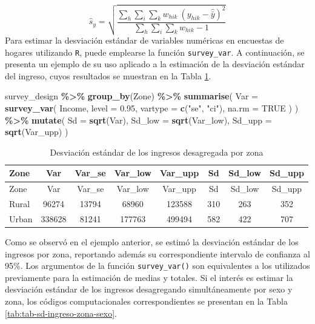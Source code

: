 \documentclass[
  spanish,
  12pt,
]{book}
\newenvironment{Shaded}{\begin{snugshade}}{\end{snugshade}}
\newcommand{\AttributeTok}[1]{\textcolor[rgb]{0.13,0.29,0.53}{#1}}
\newcommand{\ConstantTok}[1]{\textcolor[rgb]{0.56,0.35,0.01}{#1}}
\newcommand{\FloatTok}[1]{\textcolor[rgb]{0.00,0.00,0.81}{#1}}
\newcommand{\FunctionTok}[1]{\textcolor[rgb]{0.13,0.29,0.53}{\textbf{#1}}}
\newcommand{\NormalTok}[1]{#1}
\newcommand{\SpecialCharTok}[1]{\textcolor[rgb]{0.81,0.36,0.00}{\textbf{#1}}}
\newcommand{\StringTok}[1]{\textcolor[rgb]{0.31,0.60,0.02}{#1}}
\begin{document}
\[
\hat s_y  =  \sqrt{\frac{\sum_{h}\sum_{i}\sum_{k} w_{hik} \ \left(y_{hik}-\hat{\bar{y}}\right)^{2}}{\sum_{h}\sum_{i}\sum_{k} w_{hik}-1}}
\]
Para estimar la desviación estándar de variables numéricas en encuestas de hogares utilizando \texttt{R}, puede emplearse la función \texttt{survey\_var}. A continuación, se presenta un ejemplo de su uso aplicado a la estimación de la desviación estándar del ingreso, cuyos resultados se muestran en la Tabla \ref{tab:tab-sd-ingreso-zona}.

\begin{Shaded}
\begin{Highlighting}[]
\NormalTok{survey\_design }\SpecialCharTok{\%\textgreater{}\%}
  \FunctionTok{group\_by}\NormalTok{(Zone) }\SpecialCharTok{\%\textgreater{}\%}
  \FunctionTok{summarise}\NormalTok{(}
    \AttributeTok{Var =} \FunctionTok{survey\_var}\NormalTok{(}
\NormalTok{      Income,}
      \AttributeTok{level =} \FloatTok{0.95}\NormalTok{,}
      \AttributeTok{vartype =} \FunctionTok{c}\NormalTok{(}\StringTok{"se"}\NormalTok{, }\StringTok{"ci"}\NormalTok{),}
      \AttributeTok{na.rm =} \ConstantTok{TRUE}
\NormalTok{    )}
\NormalTok{  ) }\SpecialCharTok{\%\textgreater{}\%}
  \FunctionTok{mutate}\NormalTok{(}
    \AttributeTok{Sd     =} \FunctionTok{sqrt}\NormalTok{(Var),}
    \AttributeTok{Sd\_low =} \FunctionTok{sqrt}\NormalTok{(Var\_low),}
    \AttributeTok{Sd\_upp =} \FunctionTok{sqrt}\NormalTok{(Var\_upp)}
\NormalTok{  )}
\end{Highlighting}
\end{Shaded}

\begin{longtable}[]{@{}lccccccc@{}}
\caption{\label{tab:tab-sd-ingreso-zona}Desviación estándar de los ingresos desagregada por zona}\tabularnewline
\toprule\noalign{}
Zone & Var & Var\_se & Var\_low & Var\_upp & Sd & Sd\_low & Sd\_upp \\
\midrule\noalign{}
\endfirsthead
\toprule\noalign{}
Zone & Var & Var\_se & Var\_low & Var\_upp & Sd & Sd\_low & Sd\_upp \\
\midrule\noalign{}
\endhead
\bottomrule\noalign{}
\endlastfoot
Rural & 96274 & 13794 & 68960 & 123588 & 310 & 263 & 352 \\
Urban & 338628 & 81241 & 177763 & 499494 & 582 & 422 & 707 \\
\end{longtable}

Como se observó en el ejemplo anterior, se estimó la desviación estándar de los ingresos por zona, reportando además su correspondiente intervalo de confianza al 95\%. Los argumentos de la función \texttt{survey\_var()} son equivalentes a los utilizados previamente para la estimación de medias y totales. Si el interés es estimar la desviación estándar de los ingresos desagregando simultáneamente por sexo y zona, los códigos computacionales correspondientes se presentan en la Tabla \ref{tab:tab-sd-ingreso-zona-sexo}.
\end{document}
